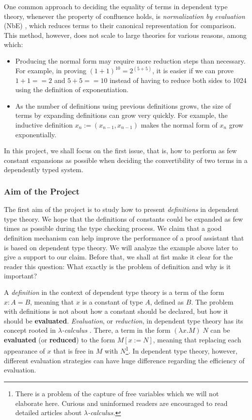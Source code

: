 \documentclass{article}
\theoremstyle{remark}
\begin{document}
One common approach to deciding the equality of terms in dependent type theory, whenever the property of confluence holds, is \textit{normalization by evaluation} (NbE) \cite{berger1998normalization}, which reduces terms to their canonical representation for comparison. This method, however, does not scale to large theories for various reasons, among which:
\begin{itemize}
\item Producing the normal form may require more reduction steps than necessary. For example, in proving $(1 + 1) ^ {10} = 2 ^{(5 + 5)}$, it is easier if we can prove $1 + 1 == 2$ and $5 + 5 == 10$ instead of having to reduce both sides to 1024 using the definition of exponentiation.
\item As the number of definitions using previous definitions grows, the size of terms by expanding definitions can grow very quickly. For example, the inductive definition $x_n := (x_{n-1}, x_{n-1})$ makes the normal form of $x_{n}$ grow exponentially.
\end{itemize}

In this project, we shall focus on the first issue, that is, how to perform as few constant expansions as possible when deciding the convertibility of two terms in a dependently typed system. 

\subsubsection{Aim of the Project}
The first aim of the project is to study how to present \emph{definitions} in dependent type theory. We hope that the definitions of constants could be expanded as few times as possible during the type checking process. We claim that a good definition mechanism can help improve the performance of a proof assistant that is based on dependent type theory. We will analyze the example above later to give a support to our claim. Before that, we shall at fist make it clear for the reader this question: What exactly is the problem of definition and why is it important?

A \emph{definition} in the context of dependent type theory is a term of the form $x : A = B$, meaning that $x$ is a constant of type $A$, defined as $B$. The problem with definitions is not about how a constant should be declared, but how it should be \textbf{evaluated}. \emph{Evaluation}, or \emph{reduction}, in dependent type theory has its concept rooted in \emph{$\lambda$-calculus} \cite{barendregt1984lambda}. There, a term in the form $(\lambda x . M) \;N$ can be \textbf{evaluated} (or \textbf{reduced}) to the form $M[x := N]$, meaning that replacing each appearance of $x$ that is free in $M$ with $N$\footnote{There is a problem of the capture of free variables which we will not elaborate here. Curious and uninformed readers are encouraged to read detailed articles about \emph{$\lambda$-calculus.}}. In dependent type theory, however, different evaluation strategies can have huge difference regarding the efficiency of evaluation. 
\end{document}
